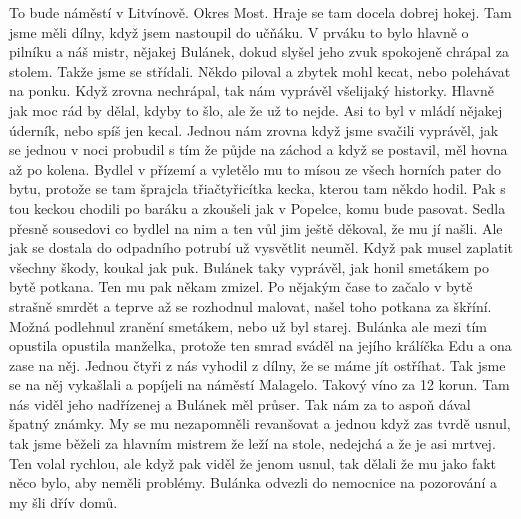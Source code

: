 
To bude náměstí v Litvínově. Okres Most. Hraje se tam docela dobrej
hokej. Tam jsme měli dílny, když jsem nastoupil do učňáku. V prváku to
bylo hlavně o pilníku a náš mistr, nějakej Bulánek, dokud slyšel jeho
zvuk spokojeně chrápal za stolem. Takže jsme se střídali. Někdo
piloval a zbytek mohl kecat, nebo polehávat na ponku. Když zrovna
nechrápal, tak nám vyprávěl všelijaký historky. Hlavně jak moc rád by
dělal, kdyby to šlo, ale že už to nejde. Asi to byl v mládí nějakej
úderník, nebo spíš jen kecal. Jednou nám zrovna když jsme svačili
vyprávěl, jak se jednou v noci probudil s tím že půjde na záchod a
když se postavil, měl hovna až po kolena. Bydlel v přízemí a vyletělo
mu to mísou ze všech horních pater do bytu, protože se tam šprajcla
třiačtyřicítka kecka, kterou tam někdo hodil. Pak s tou keckou chodili
po baráku a zkoušeli jak v Popelce, komu bude pasovat. Sedla přesně
sousedovi co bydlel na nim a ten vůl jim ještě děkoval, že mu jí
našli. Ale jak se dostala do odpadního potrubí už vysvětlit neuměl.
Když pak musel zaplatit všechny škody, koukal jak puk. Bulánek taky
vyprávěl, jak honil smetákem po bytě potkana. Ten mu pak někam zmizel.
Po nějakým čase to začalo v bytě strašně smrdět a teprve až se
rozhodnul malovat, našel toho potkana za škříní. Možná podlehnul
zranění smetákem, nebo už byl starej. Bulánka ale mezi tím opustila
opustila manželka, protože ten smrad sváděl na jejího králíčka Edu a
ona zase na něj. Jednou čtyři z nás vyhodil z dílny, že se máme jít
ostříhat. Tak jsme se na něj vykašlali a popíjeli na náměstí Malagelo.
Takový víno za 12 korun. Tam nás viděl jeho nadřízenej a Bulánek měl
průser. Tak nám za to aspoň dával špatný známky. My se mu nezapomněli
revanšovat a jednou když zas tvrdě usnul, tak jsme běželi za hlavním
mistrem že leží na stole, nedejchá a že je asi mrtvej. Ten volal
rychlou, ale když pak viděl že jenom usnul, tak dělali že mu jako fakt
něco bylo, aby neměli problémy. Bulánka odvezli do nemocnice na
pozorování a my šli dřív domů.


